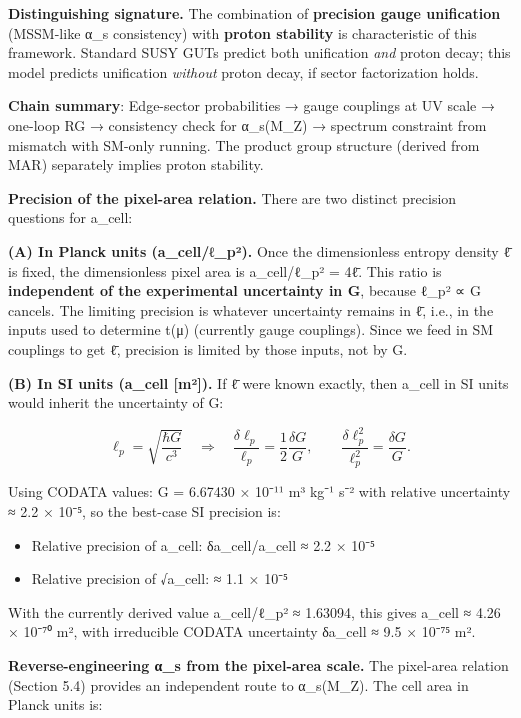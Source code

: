 \textbf{Distinguishing signature.} The combination of \textbf{precision gauge unification} (MSSM-like α\_s consistency) with \textbf{proton stability} is characteristic of this framework. Standard SUSY GUTs predict both unification \emph{and} proton decay; this model predicts unification \emph{without} proton decay, if sector factorization holds.

\textbf{Chain summary}: Edge-sector probabilities → gauge couplings at UV scale → one-loop RG → consistency check for α\_s(M\_Z) → spectrum constraint from mismatch with SM-only running. The product group structure (derived from MAR) separately implies proton stability.

\textbf{Precision of the pixel-area relation.} There are two distinct precision questions for a\_cell:

\textbf{(A) In Planck units (a\_cell/ℓ\_p²).} Once the dimensionless entropy density \={ℓ} is fixed, the dimensionless pixel area is a\_cell/ℓ\_p² = 4\={ℓ}. This ratio is \textbf{independent of the experimental uncertainty in G}, because ℓ\_p² ∝ G cancels. The limiting precision is whatever uncertainty remains in \={ℓ}, i.e., in the inputs used to determine t(μ) (currently gauge couplings). Since we feed in SM couplings to get \={ℓ}, precision is limited by those inputs, not by G.

\textbf{(B) In SI units (a\_cell {[}m²{]}).} If \={ℓ} were known exactly, then a\_cell in SI units would inherit the uncertainty of G:

\[
\ell_p = \sqrt{\frac{\hbar G}{c^3}} \quad \Rightarrow \quad
\frac{\delta \ell_p}{\ell_p} = \frac{1}{2}\frac{\delta G}{G}, \qquad
\frac{\delta \ell_p^2}{\ell_p^2} = \frac{\delta G}{G}.
\]

Using CODATA values: G = 6.67430 × 10⁻¹¹ m³ kg⁻¹ s⁻² with relative uncertainty ≈ 2.2 × 10⁻⁵, so the best-case SI precision is:

\begin{itemize}
\tightlist
\item
  Relative precision of a\_cell: δa\_cell/a\_cell ≈ 2.2 × 10⁻⁵
\item
  Relative precision of √a\_cell: ≈ 1.1 × 10⁻⁵
\end{itemize}

With the currently derived value a\_cell/ℓ\_p² ≈ 1.63094, this gives a\_cell ≈ 4.26 × 10⁻⁷⁰ m², with irreducible CODATA uncertainty δa\_cell ≈ 9.5 × 10⁻⁷⁵ m².

\textbf{Reverse-engineering α\_s from the pixel-area scale.} The pixel-area relation (Section 5.4) provides an independent route to α\_s(M\_Z). The cell area in Planck units is:

